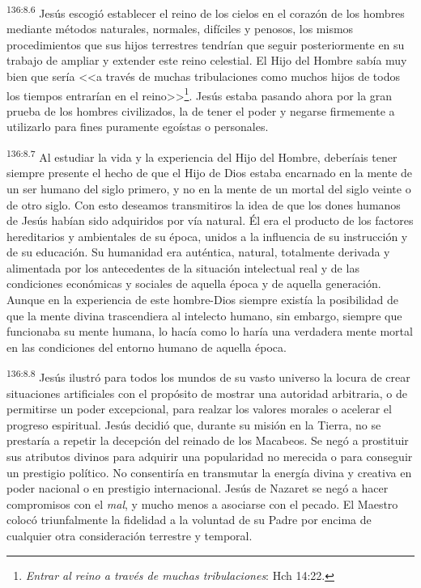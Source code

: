 \par 
\textsuperscript{136:8.6} Jesús escogió establecer el reino de los cielos en el corazón de los hombres mediante métodos naturales, normales, difíciles y penosos, los mismos procedimientos que sus hijos terrestres tendrían que seguir posteriormente en su trabajo de ampliar y extender este reino celestial. El Hijo del Hombre sabía muy bien que sería <<a través de muchas tribulaciones como muchos hijos de todos los tiempos entrarían en el reino>>\footnote{\textit{Entrar al reino a través de muchas tribulaciones}: Hch 14:22.}. Jesús estaba pasando ahora por la gran prueba de los hombres civilizados, la de tener el poder y negarse firmemente a utilizarlo para fines puramente egoístas o personales.

\par 
\textsuperscript{136:8.7} Al estudiar la vida y la experiencia del Hijo del Hombre, deberíais tener siempre presente el hecho de que el Hijo de Dios estaba encarnado en la mente de un ser humano del siglo primero, y no en la mente de un mortal del siglo veinte o de otro siglo. Con esto deseamos transmitiros la idea de que los dones humanos de Jesús habían sido adquiridos por vía natural. Él era el producto de los factores hereditarios y ambientales de su época, unidos a la influencia de su instrucción y de su educación. Su humanidad era auténtica, natural, totalmente derivada y alimentada por los antecedentes de la situación intelectual real y de las condiciones económicas y sociales de aquella época y de aquella generación. Aunque en la experiencia de este hombre-Dios siempre existía la posibilidad de que la mente divina trascendiera al intelecto humano, sin embargo, siempre que funcionaba su mente humana, lo hacía como lo haría una verdadera mente mortal en las condiciones del entorno humano de aquella época.

\par 
\textsuperscript{136:8.8} Jesús ilustró para todos los mundos de su vasto universo la locura de crear situaciones artificiales con el propósito de mostrar una autoridad arbitraria, o de permitirse un poder excepcional, para realzar los valores morales o acelerar el progreso espiritual. Jesús decidió que, durante su misión en la Tierra, no se prestaría a repetir la decepción del reinado de los Macabeos. Se negó a prostituir sus atributos divinos para adquirir una popularidad no merecida o para conseguir un prestigio político. No consentiría en transmutar la energía divina y creativa en poder nacional o en prestigio internacional. Jesús de Nazaret se negó a hacer compromisos con el \textit{mal}, y mucho menos a asociarse con el pecado. El Maestro colocó triunfalmente la fidelidad a la voluntad de su Padre por encima de cualquier otra consideración terrestre y temporal.

